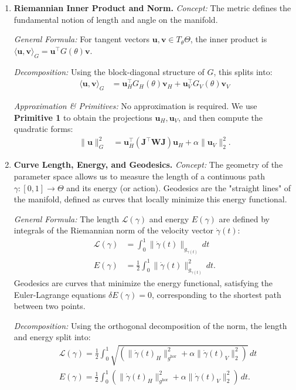 \begin{enumerate}
    \item \textbf{Riemannian Inner Product and Norm.}
    \emph{Concept:} The metric defines the fundamental notion of length and angle on the manifold.
    
    \emph{General Formula:} For tangent vectors $\mathbf{u}, \mathbf{v} \in T_\theta \Theta$, the inner product is $\langle \mathbf{u}, \mathbf{v} \rangle_G = \mathbf{u}^\top G(\theta) \mathbf{v}$.
    
    \emph{Decomposition:} Using the block-diagonal structure of $G$, this splits into:
    \begin{align}
        \langle \mathbf{u}, \mathbf{v} \rangle_G &= \mathbf{u}_H^\top G_H(\theta) \mathbf{v}_H + \mathbf{u}_V^\top G_V(\theta) \mathbf{v}_V
    \end{align}
    
    \emph{Approximation \& Primitives:} No approximation is required. We use \textbf{Primitive 1} to obtain the projections $\mathbf{u}_H, \mathbf{u}_V$, and then compute the quadratic forms:
    \begin{align}
        \|\mathbf{u}\|_G^2 &= \mathbf{u}_H^\top (\mathbf{J}^\top \mathbf{W} \mathbf{J}) \mathbf{u}_H + \alpha \|\mathbf{u}_V\|_2^2.
    \end{align}

    \item \textbf{Curve Length, Energy, and Geodesics.}
    \emph{Concept:} 
    The geometry of the parameter space allows us to measure the length of a continuous path $\gamma: [0,1] \to \Theta$ and its energy (or action). Geodesics are the "straight lines" of the manifold, defined as curves that locally minimize this energy functional.
    
    \emph{General Formula:}
    The length $\mathcal{L}(\gamma)$ and energy $E(\gamma)$ are defined by integrals of the Riemannian norm of the velocity vector $\dot{\gamma}(t)$:
    \begin{align}
        \mathcal{L}(\gamma) &= \int_0^1 \|\dot{\gamma}(t)\|_{g_{\gamma(t)}} \, dt \\
        E(\gamma) &= \frac{1}{2} \int_0^1 \|\dot{\gamma}(t)\|_{g_{\gamma(t)}}^2 \, dt.
    \end{align}
    Geodesics are curves that minimize the energy functional, satisfying the Euler-Lagrange equations $\delta E(\gamma) = 0$, corresponding to the shortest path between two points.
    
    \emph{Decomposition:}
    Using the orthogonal decomposition of the norm, the length and energy split into:
    \begin{align}
        & \mathcal{L}(\gamma) = \frac{1}{2} \int_0^1 \sqrt{\left( \|\dot{\gamma}(t)_H\|_{g^{\mathrm{hor}}}^2 + \alpha \|\dot{\gamma}(t)_V\|_2^2 \right)} \, dt \\
        &E(\gamma) = \frac{1}{2} \int_0^1 \left( \|\dot{\gamma}(t)_H\|_{g^{\mathrm{hor}}}^2 + \alpha \|\dot{\gamma}(t)_V\|_2^2 \right) \, dt.
    \end{align}
    

\end{enumerate}
